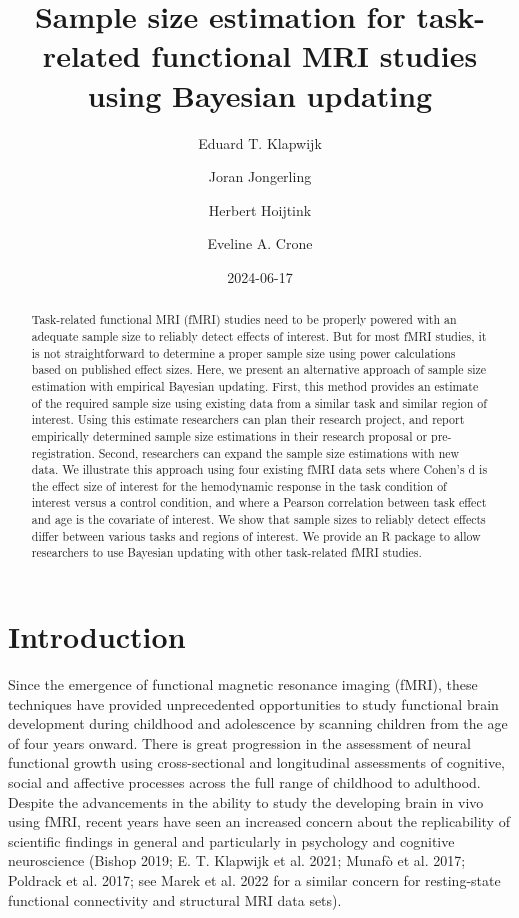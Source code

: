 \documentclass[
  letterpaper,
  DIV=11,
  numbers=noendperiod]{scrartcl}
\title{Sample size estimation for task-related functional MRI studies
using Bayesian updating}
\author{Eduard T. Klapwijk \and Joran Jongerling \and Herbert
Hoijtink \and Eveline A. Crone}
\date{2024-06-17}
\begin{document}
\maketitle
\begin{abstract}
Task-related functional MRI (fMRI) studies need to be properly powered
with an adequate sample size to reliably detect effects of interest. But
for most fMRI studies, it is not straightforward to determine a proper
sample size using power calculations based on published effect sizes.
Here, we present an alternative approach of sample size estimation with
empirical Bayesian updating. First, this method provides an estimate of
the required sample size using existing data from a similar task and
similar region of interest. Using this estimate researchers can plan
their research project, and report empirically determined sample size
estimations in their research proposal or pre-registration. Second,
researchers can expand the sample size estimations with new data. We
illustrate this approach using four existing fMRI data sets where
Cohen's d is the effect size of interest for the hemodynamic response in
the task condition of interest versus a control condition, and where a
Pearson correlation between task effect and age is the covariate of
interest. We show that sample sizes to reliably detect effects differ
between various tasks and regions of interest. We provide an R package
to allow researchers to use Bayesian updating with other task-related
fMRI studies.
\end{abstract}

\section{Introduction}\label{introduction}

Since the emergence of functional magnetic resonance imaging (fMRI),
these techniques have provided unprecedented opportunities to study
functional brain development during childhood and adolescence by
scanning children from the age of four years onward. There is great
progression in the assessment of neural functional growth using
cross-sectional and longitudinal assessments of cognitive, social and
affective processes across the full range of childhood to adulthood.
Despite the advancements in the ability to study the developing brain in
vivo using fMRI, recent years have seen an increased concern about the
replicability of scientific findings in general and particularly in
psychology and cognitive neuroscience (Bishop 2019; E. T. Klapwijk et
al. 2021; Munafò et al. 2017; Poldrack et al. 2017; see Marek et al.
2022 for a similar concern for resting-state functional connectivity and
structural MRI data sets).
\end{document}

